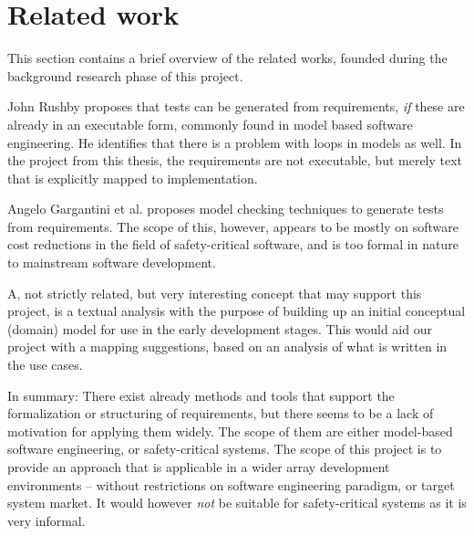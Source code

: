 \section{Related work}
This section contains a brief overview of the related works, founded during the background research phase of this project.\medskip

\noindent John Rushby\cite{rushby2008automated} proposes that tests can be generated from requirements, \emph{if} these are already in an executable form, commonly found in model based software engineering. He identifies that there is a problem with loops in models as well. In the project from this thesis, the requirements are not executable, but merely text that is explicitly mapped to implementation.\medskip

\noindent Angelo Gargantini et al. proposes model checking techniques to generate tests from requirements\cite{gargantini1999using}. The scope of this, however, appears to be mostly on software cost reductions in the field of safety-critical software, and is too formal in nature to mainstream software development.\medskip

\noindent A, not strictly related, but very interesting concept that may support this project, is a textual analysis with the purpose of building up an initial conceptual (domain) model for use in the early development stages\cite{kop2010natural}. This would aid our project with a mapping suggestions, based on an analysis of what is written in the use cases.\medskip

\noindent In summary: There exist already methods and tools that support the formalization or structuring of requirements, but there seems to be a lack of motivation for applying them widely. The scope of them are either model-based software engineering, or safety-critical systems. The scope of this project is to provide an approach that is applicable in a wider array development environments -- without restrictions on software engineering paradigm, or target system market. It would however \emph{not} be suitable for safety-critical systems as it is very informal.